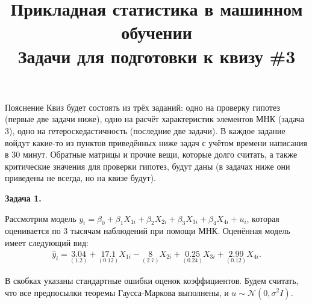 \documentclass[10pt, a4paper]{extarticle}
\title{{\normalsize Прикладная статистика в машинном обучении} \\ \vspace{0.5em} Задачи для подготовки к квизу \#3}
\author{\rule{15cm}{0.4pt}}
\begin{document}
	
	\maketitle
	
	\begin{rulesbox}{Пояснение}
		Квиз будет состоять из трёх заданий: одно на проверку гипотез (первые две задачи ниже), одно на расчёт характеристик элементов МНК (задача 3), одно на гетероскедастичность (последние две задачи). В каждое задание войдут какие-то из пунктов приведённых ниже задач с учётом времени написания в 30 минут. Обратные матрицы и прочие вещи, которые долго считать, а также критические значения для проверки гипотез, будут даны (в задачах ниже они приведены не всегда, но на квизе будут).
	\end{rulesbox}
	\vspace{1em}

	{\Large \textbf{Задача 1.}}
	
	Рассмотрим модель $y_i = \beta_0 + \beta_1X_{1i} + \beta_2X_{2i} + \beta_3X_{3i} + \beta_4X_{4i} + u_i$, которая оценивается по 3 тысячам наблюдений при помощи МНК. Оценённая модель имеет следующий вид:
	\begin{align*}
		\hat{y}_i = \underset{(1.2)}{3.04} + \underset{(0.12)}{17.1}X_{1i} - \underset{(2.7)}{8}X_{2i} + \underset{(0.24)}{0.25}X_{3i} + \underset{(0.12)}{2.99}X_{4i}.
	\end{align*}
	
	В скобках указаны стандартные ошибки оценок коэффициентов. Будем считать, что все предпосылки теоремы Гаусса-Маркова выполнены, и $u \sim \mathcal{N}(0, \sigma^2I)$.
	
\end{document}
